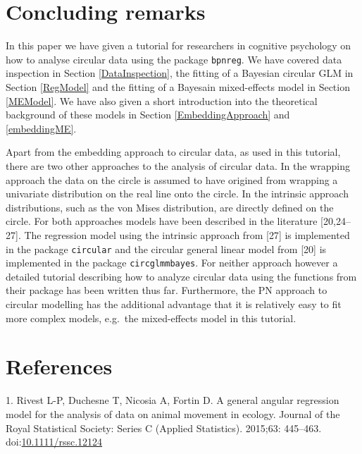 \documentclass[11pt,]{article}
\begin{document}
\section{Concluding remarks}\label{conclusion}

In this paper we have given a tutorial for researchers in cognitive
psychology on how to analyse circular data using the package
\verb|bpnreg|. We have covered data inspection in Section
\ref{DataInspection}, the fitting of a Bayesian circular GLM in Section
\ref{RegModel} and the fitting of a Bayesain mixed-effects model in
Section \ref{MEModel}. We have also given a short introduction into the
theoretical background of these models in Section
\ref{EmbeddingApproach} and \ref{embeddingME}.

Apart from the embedding approach to circular data, as used in this
tutorial, there are two other approaches to the analysis of circular
data. In the wrapping approach the data on the circle is assumed to have
origined from wrapping a univariate distribution on the real line onto
the circle. In the intrinsic approach distributions, such as the von
Mises distribution, are directly defined on the circle. For both
approaches models have been described in the literature {[}20,24--27{]}.
The regression model using the intrinsic approach from {[}27{]} is
implemented in the package \verb|circular| and the circular general
linear model from {[}20{]} is implemented in the package
\verb|circglmmbayes|. For neither approach however a detailed tutorial
describing how to analyze circular data using the functions from their
package has been written thus far. Furthermore, the PN approach to
circular modelling has the additional advantage that it is relatively
easy to fit more complex models, e.g.~the mixed-effects model in this
tutorial.

\newpage

\hypertarget{references}{%
\section*{References}\label{references}}

\hypertarget{refs}{}
\leavevmode\hypertarget{ref-rivest2015general}{}%
1. Rivest L-P, Duchesne T, Nicosia A, Fortin D. A general angular
regression model for the analysis of data on animal movement in ecology.
Journal of the Royal Statistical Society: Series C (Applied Statistics).
2015;63: 445--463.
doi:\href{https://doi.org/10.1111/rssc.12124}{10.1111/rssc.12124}
\end{document}
